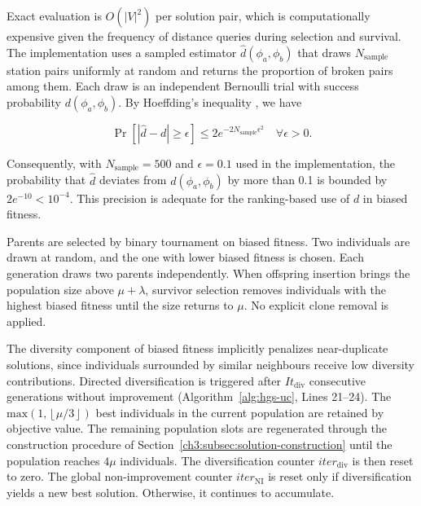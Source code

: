 Exact evaluation is $O\left( {{\left| V \right|}^{2}} \right)$ per solution pair, which is computationally expensive given the frequency of distance queries during selection and survival. The implementation uses a sampled estimator $\hat{d}\left( {{\phi }_{a}},{{\phi }_{b}} \right)$ that draws ${{N}_{\text{sample}}}$ station pairs uniformly at random and returns the proportion of broken pairs among them. Each draw is an independent Bernoulli trial with success probability $d({{\phi }_{a}},{{\phi }_{b}})$. By Hoeffding's inequality \citep{hoeffdingProbabilityInequalitiesSums1963}, we have

\begin{equation}
\Pr [|\hat{d}-d|\ge \epsilon ]\le 2{{e}^{-2{{N}_{\text{sample}}}{{\epsilon }^{2}}}}\quad \forall \epsilon >0.
\end{equation}

Consequently, with ${{N}_{\text{sample}}}=500$ and $\epsilon =0.1$ used in the implementation, the probability that $\hat{d}$ deviates from $d\left( {{\phi }_{a}},{{\phi }_{b}} \right)$ by more than 0.1 is bounded by $2{{e}^{-10}}<{{10}^{-4}}$. This precision is adequate for the ranking-based use of $d$ in biased fitness.

Parents are selected by binary tournament on biased fitness. Two individuals are drawn at random, and the one with lower biased fitness is chosen. Each generation draws two parents independently. When offspring insertion brings the population size above $\mu +\lambda $, survivor selection removes individuals with the highest biased fitness until the size returns to $\mu $. No explicit clone removal is applied.

The diversity component of biased fitness implicitly penalizes near-duplicate solutions, since individuals surrounded by similar neighbours receive low diversity contributions. Directed diversification is triggered after $I{{t}_{\text{div}}}$ consecutive generations without improvement (Algorithm~\ref{alg:hgs-uc}, Lines 21--24). The $\text{max}\left( 1,\left\lfloor \mu /3 \right\rfloor  \right)$ best individuals in the current population are retained by objective value. The remaining population slots are regenerated through the construction procedure of Section~\ref{ch3:subsec:solution-construction} until the population reaches $4\mu $ individuals. The diversification counter $ite{{r}_{\text{div}}}$ is then reset to zero. The global non-improvement counter $ite{{r}_{\text{NI}}}$ is reset only if diversification yields a new best solution. Otherwise, it continues to accumulate.

